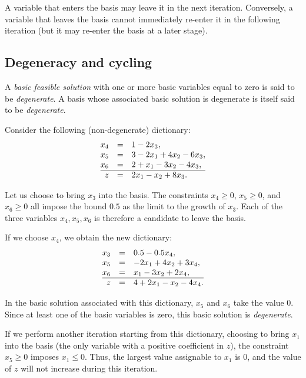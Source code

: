 \begin{remark}
  A variable that enters the basis may leave it in the next iteration. Conversely, a variable that leaves the basis cannot immediately re-enter it in the following iteration (but it may re-enter the basis at a later stage).
\end{remark}

\subsection{Degeneracy and cycling}

\begin{definition}
A \emph{basic feasible solution} with one or more basic variables equal to zero is said to be \emph{degenerate}. A basis whose associated basic solution is degenerate is itself said to be \emph{degenerate}.
\end{definition}

\begin{example}
    Consider the following (non-degenerate) dictionary:
    \[
        \begin{array}{@{}rcl@{}}
        x_4 &=& 1 - 2x_3 ,\\
        x_5 &=& 3 - 2x_1 + 4x_2 - 6x_3 ,\\
        x_6 &=& 2 + x_1 - 3x_2 - 4x_3 ,\\
        \hline z   &=& 2x_1 - x_2 + 8x_3 .
        \end{array}
    \]

    Let us choose to bring $x_3$ into the basis. The constraints $x_4 \ge 0$, $x_5 \ge 0$, and $x_6 \ge 0$ all impose the bound $0.5$ as the limit to the growth of $x_3$. Each of the three variables $x_4, x_5, x_6$ is therefore a candidate to leave the basis.

    If we choose $x_4$, we obtain the new dictionary:
    \[
        \begin{array}{@{}rcl@{}}
        x_3 &=& 0.5 - 0.5x_4 ,\\
        x_5 &=& -2x_1 + 4x_2 + 3x_4 ,\\
        x_6 &=& x_1 - 3x_2 + 2x_4 ,\\
        \hline z   &=& 4 + 2x_1 - x_2 - 4x_4 .
        \end{array}
    \]

    In the basic solution associated with this dictionary, $x_5$ and $x_6$ take the value $0$. Since at least one of the basic variables is zero, this basic solution is \emph{degenerate}.

    If we perform another iteration starting from this dictionary, choosing to bring $x_1$ into the basis (the only variable with a positive coefficient in $z$), the constraint $x_5 \ge 0$ imposes $x_1 \le 0$. Thus, the largest value assignable to $x_1$ is $0$, and the value of $z$ will not increase during this iteration.
\end{example}

